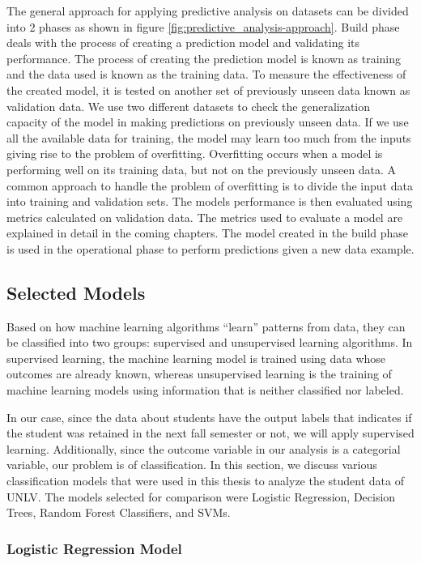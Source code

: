 \documentclass[11pt,openright]{report}
\begin{document}
The general approach for applying predictive analysis on datasets can be divided into 2 phases as shown in figure \ref{fig:predictive_analysis-approach}. Build phase deals with the process of creating a prediction model and validating its performance. The process of creating the prediction model is known as training and the data used is known as the training data. To measure the effectiveness of the created model, it is tested on another set of previously unseen data known as validation data. We use two different datasets to check the generalization capacity of the model in making predictions on previously unseen data. If we use all the available data for training, the model may learn too much from the inputs giving rise to the problem of overfitting. Overfitting occurs when a model is performing well on its training data, but not on the previously unseen data. A common approach to handle the problem of overfitting is to divide the input data into training and validation sets. The models performance is then evaluated using metrics calculated on validation data. The metrics used to evaluate a model are explained in detail in the coming chapters. The model created in the build phase is used in the operational phase to perform predictions given a new data example. 

\subsection{Selected Models}
Based on how machine learning algorithms ``learn'' patterns from data, they can be classified into two groups: supervised and unsupervised learning algorithms. In supervised learning, the machine learning model is trained using data whose outcomes are already known, whereas unsupervised learning is the training of machine learning models using information that is neither classified nor labeled. 

In our case, since the data about students have the output labels that indicates if the student was retained in the next fall semester or not, we will apply supervised learning. Additionally, since the outcome variable in our analysis is a categorial variable, our problem is of classification. In this section, we discuss various classification models that were used in this thesis to analyze the student data of UNLV. The models selected for comparison were Logistic Regression, Decision Trees, Random Forest Classifiers, and SVMs.

\subsubsection {Logistic Regression Model} \label{sssec:lr}
\end{document}
